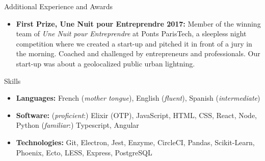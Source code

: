\documentclass[]{mcdowellcv}
\begin{document}
    \begin{cvsection}{Additional Experience and Awards}
        \begin{cvsubsection}{}{}{}
            \begin{itemize}

                \item \textbf{First Prize, Une Nuit pour Entreprendre 2017:} Member of the winning team of \textit{Une Nuit pour Entreprendre} at Ponts ParisTech, a sleepless
                night competition where we created a start-up and pitched it in front of a jury in the morning.
                Coached and challenged by entrepreneurs and professionals.
                Our start-up was about a geolocalized public urban lightning.

            \end{itemize}
        \end{cvsubsection}
    \end{cvsection}

    \begin{cvsection}{Skills}
        \begin{cvsubsection}{}{}{}
            \begin{itemize}
                \item \textbf{Languages:} French (\textit{mother tongue}), English (\textit{fluent}), Spanish (\textit{intermediate})
                \item \textbf{Software:} (\textit{proficient}:) Elixir (OTP), JavaScript, HTML, CSS, React, Node, Python (\textit{familiar}:) Typescript, Angular
                \item \textbf{Technologies:} Git, Electron, Jest, Enzyme, CircleCI, Pandas, Scikit-Learn, Phoenix, Ecto, LESS, Express, PostgreSQL
            \end{itemize}
        \end{cvsubsection}
    \end{cvsection}
\end{document}
